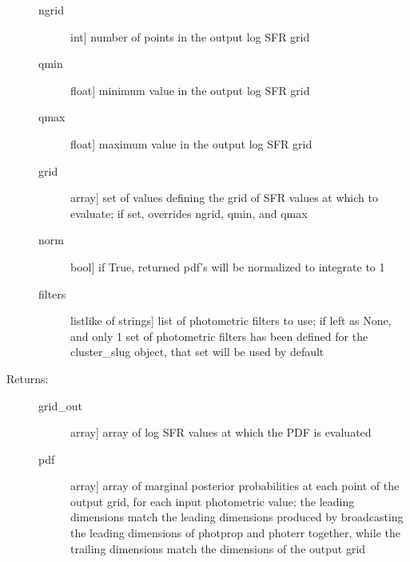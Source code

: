 \documentclass[letterpaper,10pt,english]{sphinxmanual}
\begin{document}
\begin{fulllineitems}
\begin{fulllineitems}
\begin{description}
\begin{description}
\item[{ngrid}] \leavevmode{[}int{]}
number of points in the output log SFR grid

\item[{qmin}] \leavevmode{[}float{]}
minimum value in the output log SFR grid

\item[{qmax}] \leavevmode{[}float{]}
maximum value in the output log SFR grid

\item[{grid}] \leavevmode{[}array{]}
set of values defining the grid of SFR values at which
to evaluate; if set, overrides ngrid, qmin, and qmax

\item[{norm}] \leavevmode{[}bool{]}
if True, returned pdf’s will be normalized to integrate
to 1

\item[{filters}] \leavevmode{[}listlike of strings{]}
list of photometric filters to use; if left as None, and
only 1 set of photometric filters has been defined for
the cluster\_slug object, that set will be used by
default

\end{description}

\item[{Returns:}] \leavevmode\begin{description}
\item[{grid\_out}] \leavevmode{[}array{]}
array of log SFR values at which the PDF is evaluated

\item[{pdf}] \leavevmode{[}array{]}
array of marginal posterior probabilities at each point
of the output grid, for each input photometric value;
the leading dimensions match the leading dimensions
produced by broadcasting the leading dimensions of
photprop and photerr together, while the trailing
dimensions match the dimensions of the output grid

\end{description}

\end{description}

\end{fulllineitems}


\end{fulllineitems}
\end{document}
